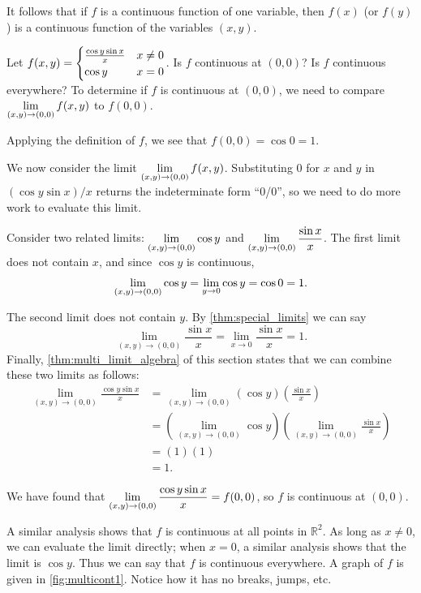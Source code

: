 It follows that if $f$ is a continuous function of one variable, then $f(x)$ (or $f(y)$) is a continuous function of the variables $(x,y)$.

\begin{example}\label{ex_multicont1}%
Let $\displaystyle f(x,y) = \begin{cases} \frac{\cos y\sin x}{x} & x\neq 0 \\
	\cos y & x=0
	\end{cases}$. Is $f$ continuous at $(0,0)$? Is $f$ continuous everywhere?
\solution
To determine if $f$ is continuous at $(0,0)$, we need to compare $\displaystyle\lim_{(x,y)\to (0,0)} f(x,y)$ to $f(0,0)$. 

Applying the definition of $f$, we see that $f(0,0) = \cos 0 = 1$. 

We now consider the limit $\displaystyle \lim_{(x,y)\to (0,0)} f(x,y)$. Substituting $0$ for $x$ and $y$ in $(\cos y\sin x)/x$ returns the indeterminate form ``0/0'', so we need to do more work to evaluate this limit.

Consider two related limits: $\displaystyle \lim_{(x,y)\to (0,0)} \cos y$ and $\displaystyle \lim_{(x,y)\to(0,0)} \frac{\sin x}x$. The first limit does not contain $x$, and since $\cos y$ is continuous,
\[\displaystyle \lim_{(x,y)\to (0,0)} \cos y =\lim_{y\to 0} \cos y = \cos 0 = 1.\]

The second limit does not contain $y$. By \autoref{thm:special_limits} we can say
\[\lim_{(x,y)\to (0,0)} \frac{\sin x}{x} = \lim_{x\to 0} \frac{\sin x}{x} = 1.\]
Finally, \autoref{thm:multi_limit_algebra} of this section states that we can combine these two limits as follows:
\begin{align*}
\lim_{(x,y)\to (0,0)} \frac{\cos y\sin x}{x} &= \lim_{(x,y)\to (0,0)} (\cos y)\left(\frac{\sin x}{x}\right) \\ 
&=\left(\lim_{(x,y)\to (0,0)} \cos y\right)\left(\lim_{(x,y)\to (0,0)} \frac{\sin x}{x}\right) \\
  &= (1)(1)\\
	&=1.
\end{align*}

We have found that $\displaystyle \lim_{(x,y)\to (0,0)} \frac{\cos y\sin x}{x} = f(0,0)$, so $f$ is continuous at $(0,0)$.


A similar analysis shows that $f$ is continuous at all points in $\mathbb{R}^2$. As long as $x\neq0$, we can evaluate the limit directly; when $x=0$, a similar analysis shows that the limit is $\cos y$. Thus we can say that $f$ is continuous everywhere. A graph of $f$ is given in \autoref{fig:multicont1}. Notice how it has no breaks, jumps, etc.
\end{example}

